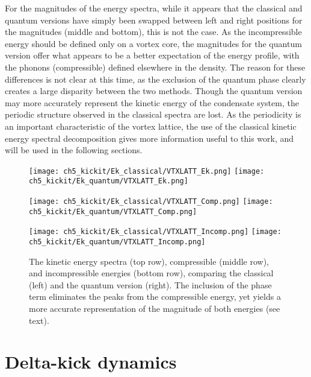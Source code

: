 For the magnitudes of the energy spectra, while it appears that the classical and quantum versions have simply been swapped between left and right positions for the magnitudes (middle and bottom), this is not the case. As the incompressible energy should be defined only on a vortex core, the magnitudes for the quantum version offer what appears to be a better expectation of the energy profile, with the phonons (compressible) defined elsewhere in the density. The reason for these differences is not clear at this time, as the exclusion of the quantum phase clearly creates a large disparity between the two methods. Though the quantum version may more accurately represent the kinetic energy of the condensate system, the periodic structure observed in the classical spectra are lost. As the periodicity is an important characteristic of the vortex lattice, the use of the classical kinetic energy spectral decomposition gives more information useful to this work, and will be used in the following sections.

\begin{figure}
    \centering
    \texttt{[image: ch5\_kickit/Ek\_classical/VTXLATT\_Ek.png]}
    \texttt{[image: ch5\_kickit/Ek\_quantum/VTXLATT\_Ek.png]}

    \texttt{[image: ch5\_kickit/Ek\_classical/VTXLATT\_Comp.png]}
    \texttt{[image: ch5\_kickit/Ek\_quantum/VTXLATT\_Comp.png]}

    \texttt{[image: ch5\_kickit/Ek\_classical/VTXLATT\_Incomp.png]}
    \texttt{[image: ch5\_kickit/Ek\_quantum/VTXLATT\_Incomp.png]}

\caption[Kinetic energy spectra with and without quantum phase.]{The kinetic energy spectra (top row), compressible (middle row), and incompressible energies (bottom row), comparing the classical (left) and the quantum version (right). The inclusion of the phase term eliminates the peaks from the compressible energy, yet yields a more accurate representation of the magnitude of both energies (see text).}
\label{fig:ek_clvqu}
\end{figure}


\section{Delta-kick dynamics}\label{sec:kickvl}
